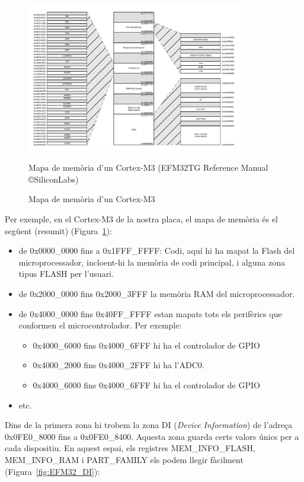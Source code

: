 \begin{figure}
 \centering
 \includegraphics[width=0.85\textwidth, keepaspectratio]{imatges/Cortex-M3-MemoryMap.png}
 \caption{Mapa de memòria d'un Cortex-M3}{Mapa de memòria d'un Cortex-M3 (EFM32TG Reference Manual \cite{EFM32GRM} \copyright SiliconLabs)}
 \label{fig:M3MemoryMap}
\end{figure}

Per exemple, en el Cortex-M3 de la nostra placa, el mapa de memòria és el següent (resumit) (Figura~\ref{fig:M3MemoryMap}):
\begin{itemize}
\item de 0x0000\_0000 fins a 0x1FFF\_FFFF: Codi, aquí hi ha mapat la Flash del microprocessador, incloent-hi la memòria de codi principal, i alguna zona tipus FLASH per l’usuari.
\item de 0x2000\_0000 fins 0x2000\_3FFF la memòria RAM del microprocessador.
\item de 0x4000\_0000 fins 0x40FF\_FFFF estan mapats tots els perifèrics que conformen el microcontrolador. Per exemple:
\begin{itemize}
\item 0x4000\_6000 fins 0x4000\_6FFF hi ha el controlador de \gls{GPIO}
\item 0x4000\_2000 fins 0x4000\_2FFF hi ha l’ADC0.
\item 0x4000\_6000 fins 0x4000\_6FFF hi ha el controlador de GPIO
\end{itemize}
\item etc.
\end{itemize}

Dins de la primera zona hi trobem la zona DI ({\em Device Information}) de l'adreça 0x0FE0\_8000 fins a 0x0FE0\_8400. Aquesta zona guarda certs valors únics per a cada dispositiu. En aquest espai, els registres MEM\_INFO\_FLASH, MEM\_INFO\_RAM i PART\_FAMILY els podem llegir fàcilment \cite[24]{EFM32GRM} (Figura~\ref{fig:EFM32_DI}):

